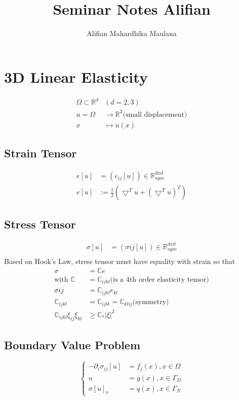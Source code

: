 \documentclass[a4paper,12pt]{article}
\title{Seminar Notes Alifian}
\author{Alifian Mahardhika Maulana}
\newcommand{\R}{\mathbb{R}}
\newcommand{\C}{\mathbb{C}}
\begin{document}
\maketitle
\section{3D Linear Elasticity}
\begin{equation}\nonumber
\begin{aligned}
\Omega \subset \R^d & (d=2,3) \\
u = \Omega & \rightarrow \R^2 \text{(small displacement)}\\
x & \mapsto u(x)
\end{aligned}
\end{equation}
\subsection{Strain Tensor}
\begin{equation}\nonumber
\begin{aligned}
e[u] & = (e_{ij}[u]) \in \R^{d x d}_{sym}\\
e[u] & := \frac{1}{2} (\bigtriangledown^Tu + (\bigtriangledown^Tu)^T)
\end{aligned}
\end{equation}
\subsection{Stress Tensor}
\begin{equation}\nonumber
\begin{aligned}
\sigma[u] &= (\sigma{ij}[u]) \in \R^{d x d}_{sym}\\
\end{aligned}
\end{equation}
Based on Hook's Law, stress tensor must have equality with strain so that
\begin{equation}\nonumber
\begin{aligned}
\sigma &= \C e\\
\text{with } \C &= \C_{ijkl} \text{(is a 4th order elasticity tensor)}\\
\sigma{ij} &= \C_{ijkl} e_{kl}\\
\C_{ijkl} &= \C_{ijlk} = \C_{klij} \text{(symmetry)}\\
\C_{ijkl} \xi_{ij} \xi_{kl} & \geq \C_* |\xi|^2
\end{aligned}
\end{equation}
\subsection{Boundary Value Problem}
\begin{equation}
\begin{cases}
-\partial_i \sigma_{ij}[u] &= f_j(x), x \in \Omega\\
u &= g(x), x \in \Gamma_D\\
\sigma[u]_\nu &= q(x), x \in \Gamma_N
\end{cases}
\end{equation}
\newpage
\end{document}
